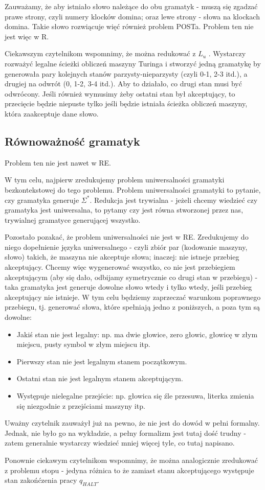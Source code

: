 Zauważamy, że aby istniało słowo należące do obu gramatyk - muszą się zgadzać prawe strony, czyli numery klocków domina; oraz lewe strony - słowa na klockach domina. Takie słowo rozwiącuje więć również problem POSTa. Problem ten nie jest więc w R.

Ciekawszym czytelnikom wspomnimy, że można redukować z \( L_u \) . Wystarczy rozważyć legalne ścieżki obliczeń maszyny Turinga i stworzyć jedną gramatykę by generowała pary kolejnych stanów parzysty-nieparzysty (czyli 0-1, 2-3 itd.), a drugiej na odwrót (0, 1-2, 3-4 itd.). Aby to działało, co drugi stan musi być odwrócony. Jeśli również wymusimy żeby ostatni stan był akceptujący, to przecięcie będzie niepuste tylko jeśli będzie istniała ścieżka obliczeń maszyny, która zaakceptuje dane słowo.

\subsection{Równoważność gramatyk}

Problem ten nie jest nawet w RE.

W tym celu, najpierw zredukujemy problem uniwersalności gramatyki bezkontekstowej do tego problemu. Problem uniwersalności gramatyki to pytanie, czy gramatyka generuje \( \Sigma^* \). Redukcja jest trywialna - jeżeli chcemy wiedzieć czy gramatyka jest uniwersalna, to pytamy czy jest równa stworzonej przez nas, trywialnej gramatyce generującej wszystko.

Pozostało pozakać, że problem uniwersalności nie jest w RE. Zredukujemy do niego dopełnienie języka uniwersalnego - czyli zbiór par (kodowanie maszyny, słowo) takich, że maszyna nie akceptuje słowa; inaczej: nie istneje przebieg akceptujący. Chcemy więc wygenerować wszystko, co nie jest przebiegiem akceptującym (aby się dało, odbijamy symetrycznie co drugi stan w przebiegu) - taka gramatyka jest generuje dowolne słowo wtedy i tylko wtedy, jeśli przebieg akceptujący nie istnieje. W tym celu będziemy zaprzeczać warunkom poprawnego przebiegu, tj. generować słowa, które spełniają jedno z poniższych, a poza tym są dowolne:

\begin{itemize}
    \item Jakiś stan nie jest legalny: np. ma dwie głowice, zero głowic, głowicę w złym miejscu, pusty symbol w złym miejscu itp.
    \item Pierwszy stan nie jest legalnym stanem początkowym.
    \item Ostatni stan nie jest legalnym stanem akceptującym.
    \item Występuje nielegalne przejście: np. głowica się źle przesuwa, literka zmienia się niezgodnie z przejściami maszyny itp.
\end{itemize}

Uważny czytelnik zauważył już na pewno, że nie jest do dowód w pełni formalny. Jednak, nie było go na wykładzie, a pełny formalizm jest tutaj dość trudny - zatem generalnie wystarczy wiedzieć mniej więcej tyle, co tutaj napisano.

Ponownie ciekawym czytelnikom wspomnimy, że można analogicznie zredukować z problemu stopu - jedyna różnica to że zamiast stanu akceptującego występuje stan zakońćzenia pracy \( q_{HALT} \).